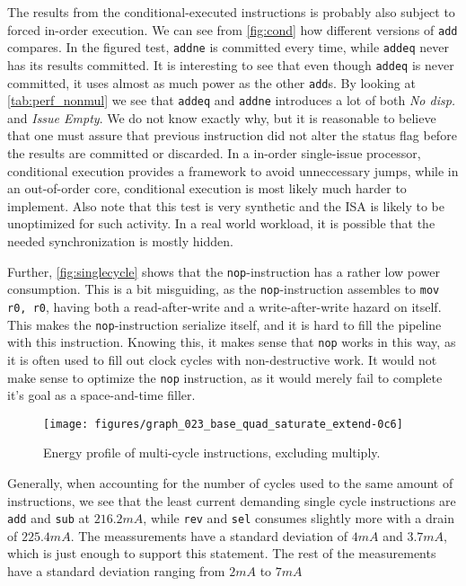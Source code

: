 The results from the conditional-executed instructions is probably also subject
to forced in-order execution. We can see from \autoref{fig:cond} how different
versions of \texttt{add} compares. In the figured test, \texttt{addne} is
committed every time, while \texttt{addeq} never has its results committed. It
is interesting to see that even though \texttt{addeq} is never committed, it
uses almost as much power as the other \texttt{add}s. By looking at
\autoref{tab:perf_nonmul} we see that \texttt{addeq} and \texttt{addne}
introduces a lot of both \emph{No disp.} and \emph{Issue Empty}. We do not know
exactly why, but it is reasonable to believe that one must assure that previous
instruction did not alter the status flag before the results are committed or
discarded. In a in-order single-issue processor, conditional execution provides
a framework to avoid unneccessary jumps, while in an out-of-order core,
conditional execution is most likely much harder to implement.  Also note that
this test is very synthetic and the ISA is likely to be unoptimized for such
activity. In a real world workload, it is possible that the needed
synchronization is mostly hidden.

Further, \autoref{fig:singlecycle} shows that the \texttt{nop}-instruction has a
rather low power consumption. This is a bit misguiding, as the
\texttt{nop}-instruction assembles to \texttt{mov r0, r0}, having both a
read-after-write and a write-after-write hazard on itself. This makes the
\texttt{nop}-instruction serialize itself, and it is hard to fill the pipeline
with this instruction.  Knowing this, it makes sense that \texttt{nop} works in
this way, as it is often used to fill out clock cycles with non-destructive
work. It would not make sense to optimize the \texttt{nop} instruction, as it
would merely fail to complete it's goal as a space-and-time filler.

\begin{figure}
    \centering
    \texttt{[image: figures/graph\_023\_base\_quad\_saturate\_extend-0c6]}
    \caption{Energy profile of multi-cycle instructions, excluding multiply.}
    \label{fig:multicycle}
\end{figure}

Generally, when accounting for the number of cycles used to the same amount of
instructions, we see that the least current demanding single cycle instructions
are \texttt{add} and \texttt{sub} at $216.2mA$, while \texttt{rev} and
\texttt{sel} consumes slightly more with a drain of $225.4mA$. The meassurements
have a standard deviation of $4mA$ and $3.7mA$, which is just enough to support
this statement. The rest of the measurements have a standard deviation ranging
from $2mA$ to $7mA$

